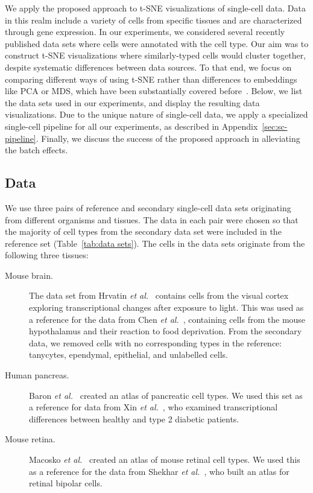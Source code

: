 \documentclass[runningheads]{llncs}
\newcommand{\etal}{\textit{et al.}}
\begin{document}
We apply the proposed approach to t-SNE visualizations of single-cell data. Data
in this realm include a variety of cells from specific tissues and are
characterized through gene expression.  In our experiments, we considered
several recently published data sets where cells were annotated with the cell
type. Our aim was to construct t-SNE visualizations where similarly-typed cells
would cluster together, despite systematic differences between data sources. To
that end, we focus on comparing different ways of using t-SNE rather than
differences to embeddings like PCA or MDS, which have been substantially covered
before~\cite{Maaten2008,Becht2019}. Below, we list the data sets used in our
experiments, and display the resulting data visualizations. Due to the unique
nature of single-cell data, we apply a specialized single-cell pipeline for all
our experiments, as described in Appendix~\ref{sec:sc-pipeline}. Finally, we
discuss the success of the proposed approach in alleviating the batch effects.


\subsection{Data}

We use three pairs of reference and secondary single-cell data sets originating
from different organisms and tissues. The data in each pair were chosen so that
the majority of cell types from the secondary data set were included in the
reference set (Table~\ref{tab:data sets}). The cells in the data sets originate
from the following three tissues:

\begin{description}
\item[Mouse brain.] The data set from Hrvatin \etal~\cite{Hrvatin2018} contains
cells from the visual cortex exploring transcriptional changes after exposure
to light. This was used as a reference for the data from Chen
\etal~\cite{Chen2017}, containing cells from the mouse hypothalamus and
their reaction to food deprivation. From the secondary data, we removed cells
with no corresponding types in the reference: tanycytes, ependymal,
epithelial, and unlabelled cells.

\item[Human pancreas.] Baron \etal~\cite{Baron2016} created
an atlas of pancreatic cell types. We used this set as a reference
for data from Xin \etal~\cite{Xin2016}, who examined transcriptional
differences between healthy and type 2 diabetic patients.

\item[Mouse retina.] Macosko \etal~\cite{Macosko2015} created
an atlas of mouse retinal cell types. We used this as a reference
for the data from Shekhar \etal~\cite{Shekhar2016}, who built an atlas for
retinal bipolar cells.
\end{description}
\end{document}
